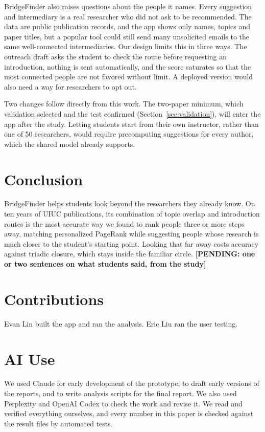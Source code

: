 \documentclass[sigconf,nonacm]{acmart}
\newcommand{\pending}[1]{\textcolor{red!70!black}{\textbf{[PENDING: #1]}}}
\begin{document}
BridgeFinder also raises questions about the people it names. Every suggestion and intermediary is a real researcher who did not ask to be recommended. The data are public publication records, and the app shows only names, topics and paper titles, but a popular tool could still send many unsolicited emails to the same well-connected intermediaries. Our design limits this in three ways. The outreach draft asks the student to check the route before requesting an introduction, nothing is sent automatically, and the score saturates so that the most connected people are not favored without limit. A deployed version would also need a way for researchers to opt out.

Two changes follow directly from this work. The two-paper minimum, which validation selected and the test confirmed (Section~\ref{sec:validation}), will enter the app after the study. Letting students start from their own instructor, rather than one of 50 researchers, would require precomputing suggestions for every author, which the shared model already supports.

\section{Conclusion}
BridgeFinder helps students look beyond the researchers they already know. On ten years of UIUC publications, its combination of topic overlap and introduction routes is the most accurate way we found to rank people three or more steps away, matching personalized PageRank while suggesting people whose research is much closer to the student's starting point. Looking that far away costs accuracy against triadic closure, which stays inside the familiar circle. \pending{one or two sentences on what students said, from the study}

\section*{Contributions}
Evan Lin built the app and ran the analysis. Eric Liu ran the user testing.

\section*{AI Use}
We used Claude for early development of the prototype, to draft early versions of the reports, and to write analysis scripts for the final report. We also used Perplexity and OpenAI Codex to check the work and revise it. We read and verified everything ourselves, and every number in this paper is checked against the result files by automated tests.



\end{document}
